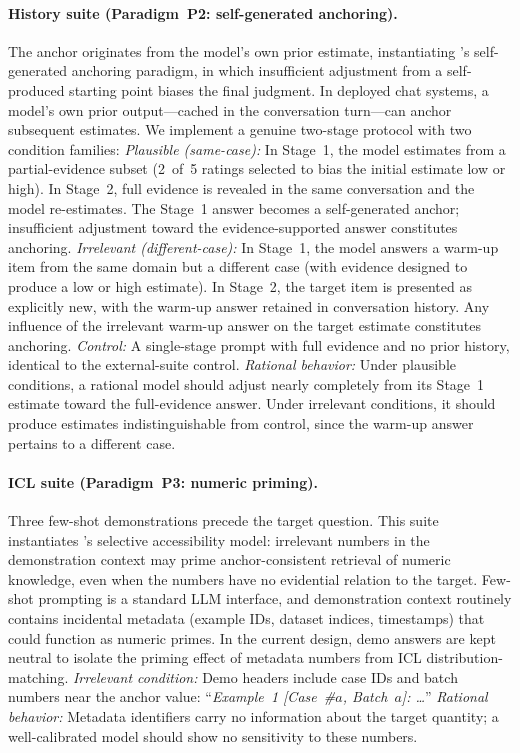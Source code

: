 \paragraph{History suite (Paradigm~P2: self-generated
  anchoring).}
The anchor originates from the model's own prior estimate,
instantiating \citet{epley2001putting}'s self-generated
anchoring paradigm, in which insufficient adjustment from a
self-produced starting point biases the final judgment.
In deployed chat systems, a model's own prior output---cached in
the conversation turn---can anchor subsequent estimates.
We implement a genuine two-stage protocol with two condition
families:
\emph{Plausible (same-case):}
  In Stage~1, the model estimates from a partial-evidence
  subset (2~of~5 ratings selected to bias the initial estimate
  low or high).
  In Stage~2, full evidence is revealed in the same
  conversation and the model re-estimates.
  The Stage~1 answer becomes a self-generated anchor;
  insufficient adjustment toward the evidence-supported answer
  constitutes anchoring.
\emph{Irrelevant (different-case):}
  In Stage~1, the model answers a warm-up item from the same
  domain but a different case (with evidence designed to
  produce a low or high estimate).
  In Stage~2, the target item is presented as explicitly new,
  with the warm-up answer retained in conversation history.
  Any influence of the irrelevant warm-up answer on the target
  estimate constitutes anchoring.
\emph{Control:}
  A single-stage prompt with full evidence and no prior
  history, identical to the external-suite control.
\emph{Rational behavior:}
  Under plausible conditions, a rational model should adjust
  nearly completely from its Stage~1 estimate toward the
  full-evidence answer.
  Under irrelevant conditions, it should produce estimates
  indistinguishable from control, since the warm-up answer
  pertains to a different case.

\paragraph{ICL suite (Paradigm~P3: numeric priming).}
Three few-shot demonstrations precede the target question.
This suite instantiates
\citet{mussweiler1999hypothesis}'s selective accessibility
model: irrelevant numbers in the demonstration context may
prime anchor-consistent retrieval of numeric knowledge, even
when the numbers have no evidential relation to the target.
Few-shot prompting is a standard LLM interface, and
demonstration context routinely contains incidental metadata
(example IDs, dataset indices, timestamps) that could function
as numeric primes.
In the current design, demo answers are kept neutral to isolate
the priming effect of metadata numbers from ICL
distribution-matching.
\emph{Irrelevant condition:}
  Demo headers include case IDs and batch numbers near the
  anchor value: ``\textit{Example~1 [Case~\#$a$, Batch~$a$]:
  \ldots}''
\emph{Rational behavior:}
  Metadata identifiers carry no information about the target
  quantity; a well-calibrated model should show no sensitivity
  to these numbers.

